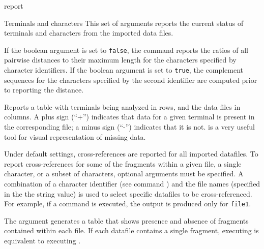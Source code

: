 \begin{command}{report}{}
\begin{arguments}
	\begin{argumentgroup}{Terminals and characters}
            {This set of arguments reports the current status of terminals and
            characters from the imported data files. }
		
                {If the boolean argument is set to \texttt{false}, the command
                reports the ratios of all pairwise distances to their maximum length
                for the characters specified by character identifiers. If the boolean
                argument is set to \texttt{true}, the complement sequences for
                the characters specified by the second identifier are computed prior
                to reporting the distance.}{}

                {Reports a table with terminals being analyzed in rows, and the
                data files in columns. A plus sign (``+'') indicates that data for a given
                terminal is
                present in the corresponding file; a minus sign (``-'') indicates that it is
                not.  is a very useful tool for visual
                representation of missing data.
                
                Under default settings, cross-references are reported for
                all imported datafiles. To report cross-references for some of
                the fragments within a given file, a single character, or a subset
                of characters, optional arguments must be specified. A combination of
                a character identifier (see command  ) and
                the file names (specified in the the string value) is used to select specific
                datafiles to be cross-referenced. For example, if a
                command  is
                executed, the output is produced only for \texttt{file1}.
                
                The argument  generates
                a table that shows presence and absence of fragments contained
                within each file. If each datafile contains a
                single fragment,  executing 
                is equivalent to executing .
                
}
\end{argumentgroup}
\end{arguments}
\end{command}
